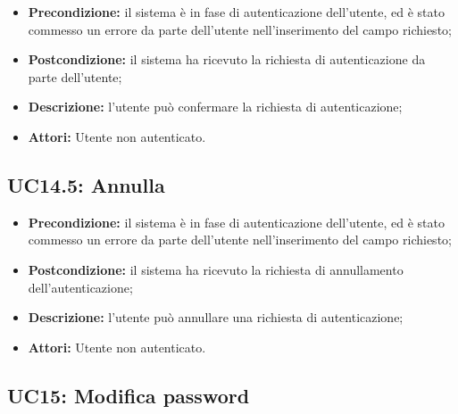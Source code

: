 \begin{itemize}
	\item \textbf{Precondizione:} il sistema è in fase di autenticazione dell'utente, ed è stato commesso un errore da parte dell'utente nell'inserimento del campo richiesto;
	\item \textbf{Postcondizione:} il sistema ha ricevuto la richiesta di autenticazione da parte dell'utente;
	\item \textbf{Descrizione:} l'utente può confermare la richiesta di autenticazione;
	\item \textbf{Attori:} Utente non autenticato.
\end{itemize}
\subsection{ UC14.5: Annulla}

\begin{itemize}
	\item \textbf{Precondizione:} il sistema è in fase di autenticazione dell'utente, ed è stato commesso un errore da parte dell'utente nell'inserimento del campo richiesto;
	\item \textbf{Postcondizione:} il sistema ha ricevuto la richiesta di annullamento dell'autenticazione;
	\item \textbf{Descrizione:} l'utente può annullare una richiesta di autenticazione;
	\item \textbf{Attori:} Utente non autenticato.
\end{itemize}
\subsection{ UC15: Modifica password}

